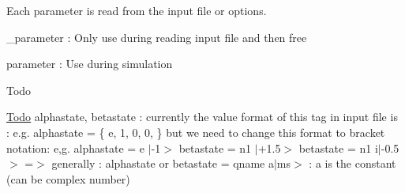 Each parameter is read from the input file or options.
\begin{DoxyItemize}
\item \-\_\-parameter \-: Only use during reading input file and then free
\item parameter \-: Use during simulation \begin{DoxyRefDesc}{Todo}
\item[\hyperlink{todo__todo000014}{Todo}]alphastate, betastate \-: currently the value format of this tag in input file is \-: e.\-g. alphastate = \{ e, 1, 0, 0, \} but we need to change this format to bracket notation\-: e,g. alphastate = e $|$-\/1$>$ betastate = n1 $|$+1.5$>$ betastate = n1 i$|$-\/0.5$>$ =$>$ generally \-: alphastate or betastate = qname a$|$ms$>$ \-: a is the constant (can be complex number) \end{DoxyRefDesc}

\end{DoxyItemize}

